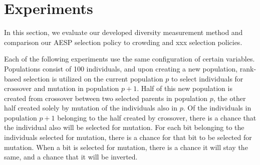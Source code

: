 \section{Experiments}
In this section, we evaluate our developed diversity measurement method and comparison our AESP selection policy to crowding and xxx selection policies.

Each of the following experiments use the same configuration of certain variables. Populations consist of \num{100} individuals, and upon creating a new population, rank-based selection is utilized on the current population $p$ to select individuals for crossover and mutation in population $p + 1$. Half of this new population is created from crossover between two selected parents in population $p$, the other half created solely by mutation of the individuals also in $p$. Of the individuals in population $p + 1$ belonging to the half created by crossover, there is a  chance that the individual also will be selected for mutation. For each bit belonging to the individuals selected for mutation, there is a  chance for that bit to be selected for mutation. When a bit is selected for mutation, there is a  chance it will stay the same, and a  chance that it will be inverted.



